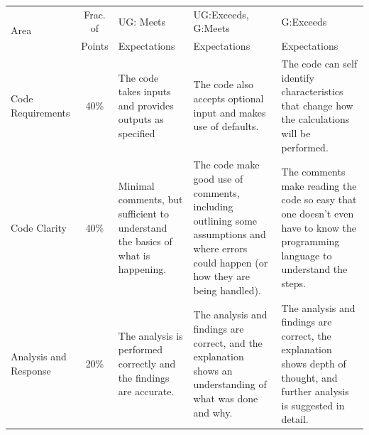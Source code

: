 \documentclass[11pt]{article}
\begin{document}
\begin{landscape}
\begin{table}
    \centering
    \small
    \begin{tabular}{p{.6in} c | p{2.25in} | p{2.25in} | p{2.25in}}
        \multirow{2}{*}{Area}  	& Frac. of   	& UG: Meets		& UG:Exceeds, G:Meets   & G:Exceeds 	  \\
                           			    & Points & Expectations  & Expectations  		& Expectations \\
        \toprule
        Code Requirements      	& 40\%\vspace{.25in} 			& The code takes inputs and provides outputs as specified & The code also accepts optional input and makes use of defaults. & The code can self identify characteristics that change how the calculations will be performed. \\
        Code Clarity            & 40\%\vspace{.25in}			& Minimal comments, but sufficient to understand the basics of what is happening. & The code make good use of comments, including outlining some assumptions and where errors could happen (or how they are being handled). & The comments make reading the code so easy that one doesn't even have to know the programming language to understand the steps. \\
        Analysis and Response   & 20\%\vspace{.25in}			& The analysis is performed correctly and the findings are accurate. & The analysis and findings are correct, and the explanation shows an understanding of what was done and why. & The analysis and findings are correct, the explanation shows depth of thought, and further analysis is suggested in detail. \\
        \bottomrule
    \end{tabular}
\end{table}
\end{landscape}
\end{document}
